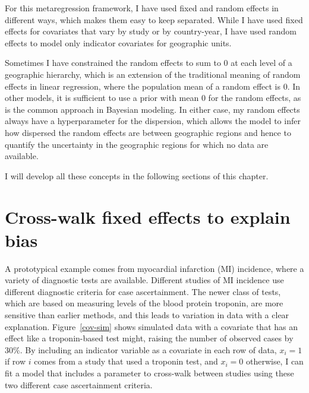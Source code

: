 For this metaregression framework, I have used fixed and
random effects in different ways, which makes them easy to keep
separated.  While I have used fixed effects for covariates that vary
by study or by country-year, I have used random effects to model only
indicator covariates for geographic units.

Sometimes I have constrained the random effects to sum to $0$ at each
level of a geographic hierarchy, which is an extension of the
traditional meaning of random effects in linear regression, where the
population mean of a random effect is $0$.  In other models, it is
sufficient to use a prior with mean $0$ for the random effects, as is
the common approach in Bayesian modeling.  In either case, my random
effects always have a hyperparameter for the dispersion, which allows
the model to infer how dispersed the random effects are between
geographic regions and hence to quantify the uncertainty in the
geographic regions for which no data are available.

I will develop all these concepts in the following
sections of this chapter.

\section{Cross-walk fixed effects to explain bias}

A prototypical example comes from myocardial infarction (MI)
incidence, where a variety of diagnostic tests are available.
Different studies of MI incidence use different diagnostic criteria
for case ascertainment.  The newer class of tests, which are based on
measuring levels of the blood protein troponin, are more sensitive
than earlier methods, and this leads to variation in data with a clear
explanation.  Figure~\ref{cov-sim} shows simulated data with a
covariate that has an effect like a troponin-based test might, raising
the number of observed cases by $30\%$. By including an indicator
variable as a covariate in each row of data, $x_i = 1$ if row $i$
comes from a study that used a troponin test, and $x_i = 0$ otherwise,
I can fit a model that includes a parameter to cross-walk between
studies using these two different case ascertainment criteria.

